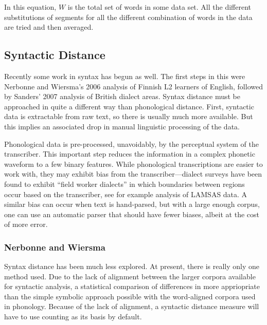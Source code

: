 \documentclass[11pt]{article}
\begin{document}
In this equation, $W$ is the total set of words in some data set. All
the different substitutions of segments for all the different
combination of words in the data are tried and then averaged.

\subsection{Syntactic  Distance}
Recently some work in syntax has begun as well. The first steps in
this were Nerbonne and Wiersma's 2006 analysis of Finnish L2 learners
of English, followed by Sanders' 2007 analysis of British dialect
areas. Syntax distance must be approached in quite a different way than
phonological distance. First, syntactic data is extractable from raw
text, so there is usually much more available. But this implies an
associated drop in manual linguistic processing of the
data.

Phonological data is pre-processed, unavoidably, by the perceptual
system of the transcriber. This important step reduces the information
in a complex phonetic waveform to a few binary features. While
phonological transcriptions are easier to work with, they may exhibit bias
from the transcriber---dialect surveys have been found to exhibit
``field worker dialects'' in which
boundaries between regions occur based on the transcriber, see for
example  analysis of LAMSAS data. A
similar bias can occur when text is hand-parsed, but with a
large enough corpus, one can use an automatic parser that should have
fewer biases, albeit at the cost of more error.

\subsubsection{Nerbonne and Wiersma}
\label{nerbonne06}

Syntax distance has been much less explored. At present, there is
really only one method used. Due to the lack of alignment between the
larger corpora available for syntactic analysis, a statistical
comparison of differences in more appriopriate than the simple
symbolic approach possible with the word-aligned corpora used in
phonology. Because of the lack of alignment, a syntactic distance
measure will have to use counting as its basis by default.
\end{document}
